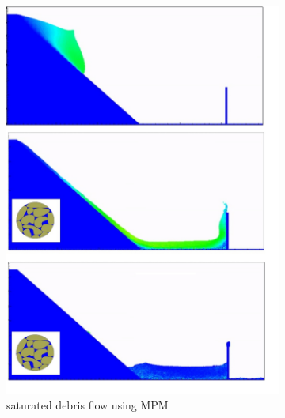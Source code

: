 \documentclass[preprint,12pt]{elsarticle}
\begin{document}
\begin{figure}
\center
\begin{subfigure}[c]{0.5\linewidth}
\includegraphics[width=\linewidth]{SHMPM.jpg}
\caption{saturated debris flow using MPM}
\label{saturatedflowa}
\end {subfigure}\hfill    
\begin{subfigure}[d]{0.5\linewidth}

\end{subfigure}
\end{figure}
\end{document}
